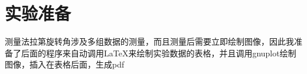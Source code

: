 \documentclass{article}
\begin{document}
\section{实验准备}

测量法拉第旋转角涉及多组数据的测量，而且测量后需要立即绘制图像，因此我准备了后面的程序来自动调用LaTeX来绘制实验数据的表格，并且调用gnuplot绘制图像，插入在表格后面，生成pdf


\end{document}
